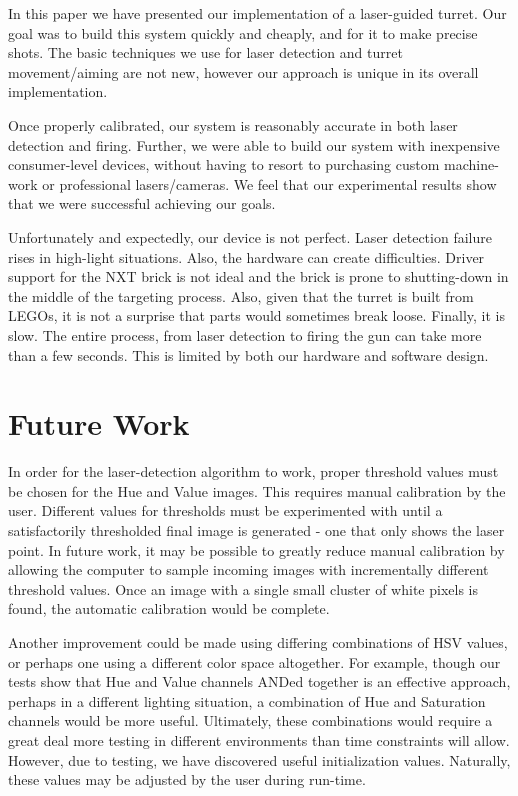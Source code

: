 \documentclass[10pt,twocolumn,letterpaper]{article}
\begin{document}
In this paper we have presented our implementation of a laser-guided turret.  Our goal was to build this system quickly and cheaply, and for it to make precise shots.  The basic techniques we use for laser detection and turret movement/aiming are not new, however our approach is unique in its overall implementation.

Once properly calibrated, our system is reasonably accurate in both laser detection and firing.  Further, we were able to build our system with inexpensive consumer-level devices, without having to resort to purchasing custom machine-work or professional lasers/cameras.  We feel that our experimental results show that we were successful achieving our goals.

Unfortunately and expectedly, our device is not perfect.  Laser detection failure rises in high-light situations.  Also, the hardware can create difficulties.  Driver support for the NXT brick is not ideal and the brick is prone to shutting-down in the middle of the targeting process.  Also, given that the turret is built from LEGOs, it is not a surprise that parts would sometimes break loose.  Finally, it is slow.  The entire process, from laser detection to firing the gun can take more than a few seconds.  This is limited by both our hardware and software design.  

\section{Future Work}

In order for the laser-detection algorithm to work, proper threshold values must be chosen for the Hue and Value images.  This requires manual calibration by the user.  Different values for thresholds must be experimented with until a satisfactorily thresholded final image is generated - one that only shows the laser point.  In future work, it may be possible to greatly reduce manual calibration by allowing the computer to sample incoming images with incrementally different threshold values.  Once an image with a single small cluster of white pixels is found, the automatic calibration would be complete.

Another improvement could be made using differing combinations of HSV values, or perhaps one using a different color space altogether.  For example, though our tests show that Hue and Value channels ANDed together is an effective approach, perhaps in a different lighting situation, a combination of Hue and Saturation channels would be more useful.  Ultimately, these combinations would require a great deal more testing in different environments than time constraints will allow.  However, due to testing, we have discovered useful initialization values.  Naturally, these values may be adjusted by the user during run-time.
\end{document}
